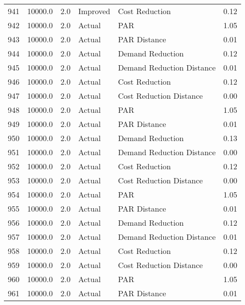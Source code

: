\begin{longtable}{lrrllr}
941  &      10000.0 &     2.0 &       Improved &             Cost Reduction &   0.12 \\
942  &      10000.0 &     2.0 &         Actual &                        PAR &   1.05 \\
943  &      10000.0 &     2.0 &         Actual &               PAR Distance &   0.01 \\
944  &      10000.0 &     2.0 &         Actual &           Demand Reduction &   0.12 \\
945  &      10000.0 &     2.0 &         Actual &  Demand Reduction Distance &   0.01 \\
946  &      10000.0 &     2.0 &         Actual &             Cost Reduction &   0.12 \\
947  &      10000.0 &     2.0 &         Actual &    Cost Reduction Distance &   0.00 \\
948  &      10000.0 &     2.0 &         Actual &                        PAR &   1.05 \\
949  &      10000.0 &     2.0 &         Actual &               PAR Distance &   0.01 \\
950  &      10000.0 &     2.0 &         Actual &           Demand Reduction &   0.13 \\
951  &      10000.0 &     2.0 &         Actual &  Demand Reduction Distance &   0.00 \\
952  &      10000.0 &     2.0 &         Actual &             Cost Reduction &   0.12 \\
953  &      10000.0 &     2.0 &         Actual &    Cost Reduction Distance &   0.00 \\
954  &      10000.0 &     2.0 &         Actual &                        PAR &   1.05 \\
955  &      10000.0 &     2.0 &         Actual &               PAR Distance &   0.01 \\
956  &      10000.0 &     2.0 &         Actual &           Demand Reduction &   0.12 \\
957  &      10000.0 &     2.0 &         Actual &  Demand Reduction Distance &   0.01 \\
958  &      10000.0 &     2.0 &         Actual &             Cost Reduction &   0.12 \\
959  &      10000.0 &     2.0 &         Actual &    Cost Reduction Distance &   0.00 \\
960  &      10000.0 &     2.0 &         Actual &                        PAR &   1.05 \\
961  &      10000.0 &     2.0 &         Actual &               PAR Distance &   0.01 \\

\end{longtable}
